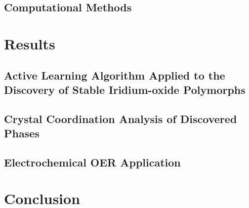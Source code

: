 \subsection{Computational Methods}


\section{Results}


  \subsection{Active Learning Algorithm Applied to the Discovery of Stable Iridium-oxide Polymorphs}
  

  \subsection{Crystal Coordination Analysis of Discovered Phases}
  

  \subsection{Electrochemical OER Application}
  


\section{Conclusion}


\begin{acknowledgement}

\end{acknowledgement}

